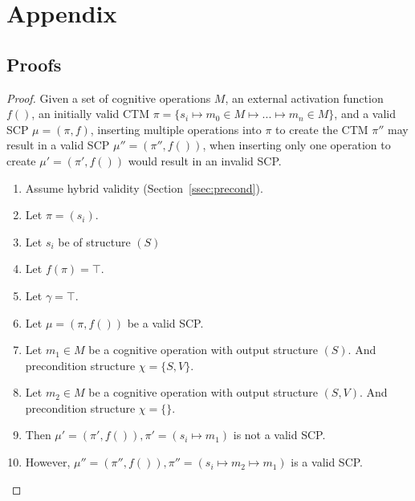 \chapter*{Appendix} \label{chp:appendix}
\section*{Proofs}

\begin{proof} \label{proof:insertionSearch}
Given a set of cognitive operations $M$, an external activation function $f()$, an initially valid CTM $\pi=\{s_i \longmapsto m_0\in M \longmapsto ... \longmapsto m_n\in M\}$, and a valid SCP $\mu=(\pi,f)$, inserting multiple operations into $\pi$ to create the CTM $\pi''$ may result in a valid SCP $\mu''=(\pi'',f())$, when inserting only one operation to create $\mu'=(\pi',f())$ would result in an invalid SCP.

\begin{enumerate}
\item Assume hybrid validity (Section~\ref{ssec:precond}).
\item Let $\pi=(s_i)$.
\item Let $s_i$ be of structure $(S)$
\item Let $f(\pi)=\top$.
\item Let $\gamma = \top$.
\item Let $\mu=(\pi,f())$ be a valid SCP.
\item Let $m_1 \in M$ be a cognitive operation with output structure $(S)$. And precondition structure $\chi=\{S,V\}$.
\item Let $m_2 \in M$ be a cognitive operation with output structure $(S,V)$. And precondition structure $\chi=\{\}$.
\item Then $\mu'=(\pi',f()), \pi'=(s_i \longmapsto m_1)$ is not a valid SCP.
\item However, $\mu''=(\pi'',f()), \pi''=(s_i \longmapsto m_2 \longmapsto m_1)$ is a valid SCP.
\end{enumerate}
\end{proof}








